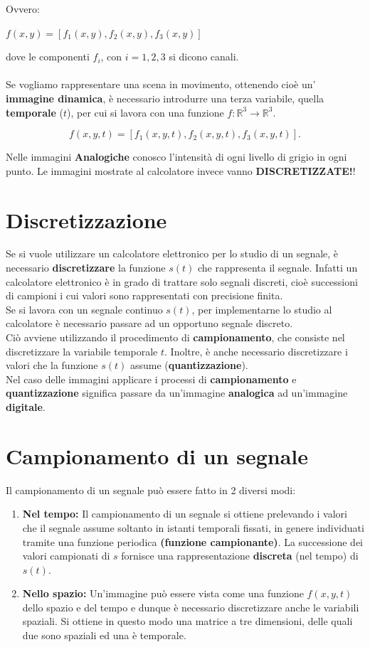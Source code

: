 Ovvero:
\begin{center}
    $f(x,y) = [f_1(x,y), f_2(x,y), f_3(x,y)]$
\end{center}
dove le componenti $f_i$, con $i = 1,2,3$ si dicono canali. \\\\Se vogliamo
rappresentare una scena in movimento, ottenendo cioè un' \textbf{immagine
    dinamica}, è necessario introdurre una terza variabile, quella
\textbf{temporale} ($t$), per cui si lavora con una funzione $f: \mathbb{R}^3 \rightarrow
    \mathbb{R}^3$.

$$
    f(x,y,t) = [f_1(x,y,t), f_2(x ,y,t), f_3(x,y,t)].
$$

Nelle immagini \textbf{Analogiche} conosco l'intensità di ogni livello di grigio
in ogni punto. Le immagini mostrate al calcolatore invece vanno
\textbf{DISCRETIZZATE!}!


\section{Discretizzazione}
Se si vuole utilizzare un calcolatore elettronico per lo studio di un segnale, è
necessario \textbf{discretizzare} la funzione $s(t)$ che rappresenta il segnale.
Infatti un calcolatore elettronico è in grado di trattare solo segnali discreti,
cioè successioni di campioni i cui valori sono rappresentati con precisione
finita. \\Se si lavora con un segnale continuo $s(t)$, per implementarne lo
studio al calcolatore è necessario passare ad un opportuno segnale discreto.\\
Ciò avviene utilizzando il procedimento di \textbf{campionamento}, che consiste
nel discretizzare la variabile temporale $t$. Inoltre, è anche necessario
discretizzare i valori che la funzione $s(t)$ assume
(\textbf{quantizzazione}).\\

Nel caso delle immagini applicare i processi di \textbf{campionamento} e
\textbf{quantizzazione} significa passare da un'immagine \textbf{analogica} ad
un'immagine \textbf{digitale}.

\section{Campionamento di un segnale}
Il campionamento di un segnale può essere fatto in 2 diversi modi:
\begin{enumerate}
    \item \textbf{Nel tempo:} Il campionamento di un segnale si ottiene
          prelevando i valori che il segnale assume soltanto in istanti
          temporali fissati, in genere individuati tramite una funzione
          periodica \textbf{(funzione campionante)}. La successione dei valori
          campionati di $s$ fornisce una rappresentazione \textbf{discreta} (nel
          tempo) di $s(t)$.
    \item \textbf{Nello spazio:} Un'immagine può essere vista come una funzione
          $f(x,y,t)$ dello spazio e del tempo e dunque è necessario
          discretizzare anche le variabili spaziali. Si ottiene in questo modo
          una matrice a tre dimensioni, delle quali due sono spaziali ed una è
          temporale.
\end{enumerate}
